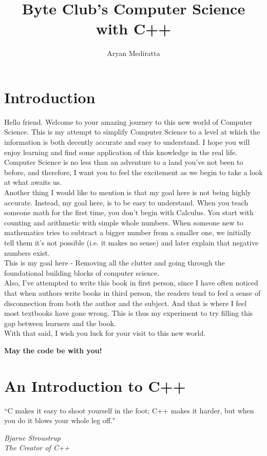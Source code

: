\documentclass[letterpaper, 12pt]{book}
\begin{document}
\date{}
\title{Byte Club's Computer Science with C++}
\author{Aryan Mediratta}
\maketitle
\tableofcontents
\chapter*{Introduction}
Hello friend. Welcome to your amazing journey to this new world of Computer Science. This is my attempt to simplify Computer Science to a level at which the information is both decently accurate and easy to understand. I hope you will enjoy learning and find some application of this knowledge in the real life. Computer Science is no less than an adventure to a land you've not been to before, and therefore, I want you to feel the excitement as we begin to take a look at what awaits us.\\
Another thing I would like to mention is that my goal here is not being highly accurate. Instead, my goal here, is to be easy to understand. When you teach someone math for the first time, you don't begin with Calculus. You start with counting and arithmetic with simple whole numbers. When someone new to mathematics tries to subtract a bigger number from a smaller one, we initially tell them it's not possible (i.e. it makes no sense) and later explain that negative numbers exist.\\
This is my goal here - Removing all the clutter and going through the foundational building blocks of computer science.\\
Also, I've attempted to write this book in first person, since I have often noticed that when authors write books in third person, the readers tend to feel a sense of disconnection from both the author and the subject. And that is where I feel most textbooks have gone wrong. This is thus my experiment to try filling this gap between learners and the book.\\
With that said, I wish you luck for your visit to this new world.\\
\begin{flushright}
\textbf{May the code be with you!}
\end{flushright}
\chapter{An Introduction to C++}
\epigraph{\centering ``C makes it easy to shoot yourself in the foot; C++ makes it harder, but when you do it blows your whole leg off."}{\textit{Bjarne Stroustrup \\ The Creator of C++}}
\end{document}
